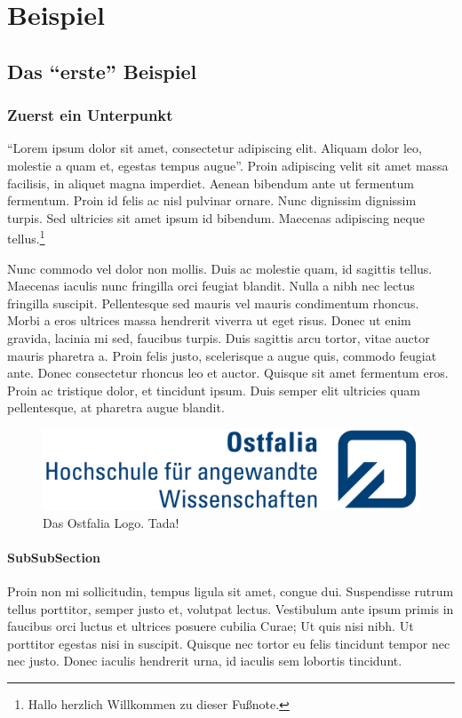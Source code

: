 \chapter{Beispiel}

\section{Das \enquote{erste} Beispiel}

\subsection{Zuerst ein Unterpunkt}
\enquote{Lorem ipsum dolor sit amet, consectetur adipiscing elit. Aliquam dolor leo, molestie a quam et, egestas tempus augue}. Proin adipiscing velit sit amet massa facilisis, in aliquet magna imperdiet. Aenean bibendum ante ut fermentum fermentum. Proin id felis ac nisl pulvinar ornare. Nunc dignissim dignissim turpis. Sed ultricies sit amet ipsum id bibendum. Maecenas adipiscing neque tellus.\footnote{Hallo herzlich Willkommen zu dieser Fußnote.}

Nunc commodo vel dolor non mollis. Duis ac molestie quam, id sagittis tellus. Maecenas iaculis nunc fringilla orci feugiat blandit. Nulla a nibh nec lectus fringilla suscipit. Pellentesque sed mauris vel mauris condimentum rhoncus. Morbi a eros ultrices massa hendrerit viverra ut eget risus. Donec ut enim gravida, lacinia mi sed, faucibus turpis. Duis sagittis arcu tortor, vitae auctor mauris pharetra a. Proin felis justo, scelerisque a augue quis, commodo feugiat ante. Donec consectetur rhoncus leo et auctor. Quisque sit amet fermentum eros. Proin ac tristique dolor, et tincidunt ipsum. Duis semper elit ultricies quam pellentesque, at pharetra augue blandit.

\begin{figure}
	\centering
	\includegraphics{bilder/ostfalia_logo.jpg}
	\caption{Das Ostfalia Logo. Tada!}
\end{figure}

\subsubsection{SubSubSection}
Proin non mi sollicitudin, tempus ligula sit amet, congue dui. Suspendisse rutrum tellus porttitor, semper justo et, volutpat lectus. Vestibulum ante ipsum primis in faucibus orci luctus et ultrices posuere cubilia Curae; Ut quis nisi nibh. Ut porttitor egestas nisi in suscipit. Quisque nec tortor eu felis tincidunt tempor nec nec justo. Donec iaculis hendrerit urna, id iaculis sem lobortis tincidunt.

